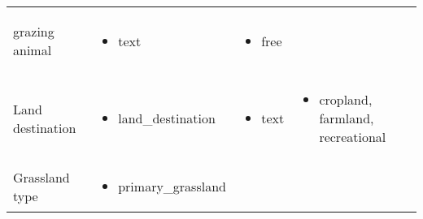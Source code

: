 \documentclass[table]{article}
\providecommand{\tightlist}{%
  \setlength{\itemsep}{0pt}\setlength{\parskip}{0pt}}
\begin{document}
\begin{longtable}[]{@{}llll@{}}
\begin{minipage}[t]{0.24\columnwidth}
\begin{itemize}
  grazing animal
\end{itemize}\strut
\end{minipage} & \begin{minipage}[t]{0.24\columnwidth}\raggedright\strut
\begin{itemize}
\tightlist
\item
  text
\end{itemize}\strut
\end{minipage} & \begin{minipage}[t]{0.24\columnwidth}\raggedright\strut
\begin{itemize}
\tightlist
\item
  free
\end{itemize}\strut
\end{minipage}\tabularnewline
\begin{minipage}[t]{0.24\columnwidth}\raggedright\strut
Land destination\strut
\end{minipage} & \begin{minipage}[t]{0.24\columnwidth}\raggedright\strut
\begin{itemize}
\tightlist
\item
  land\_destination
\end{itemize}\strut
\end{minipage} & \begin{minipage}[t]{0.24\columnwidth}\raggedright\strut
\begin{itemize}
\tightlist
\item
  text
\end{itemize}\strut
\end{minipage} & \begin{minipage}[t]{0.24\columnwidth}\raggedright\strut
\begin{itemize}
\tightlist
\item
  cropland, farmland, recreational
\end{itemize}\strut
\end{minipage}\tabularnewline
\begin{minipage}[t]{0.24\columnwidth}\raggedright\strut
Grassland type\strut
\end{minipage} & \begin{minipage}[t]{0.24\columnwidth}\raggedright\strut
\begin{itemize}
\tightlist
\item
  primary\_grassland
\end{itemize}\strut
\end{minipage} & \begin{minipage}[t]{0.24\columnwidth}\raggedright\strut

\end{minipage}
\end{longtable}
\end{document}
